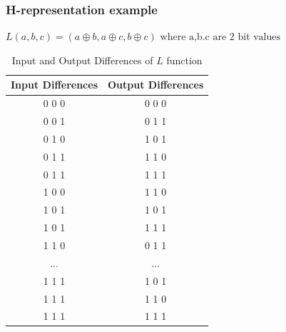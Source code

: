 \documentclass{beamer}
\begin{document}
\begin{frame}
    \frametitle{H-representation example}

    \begin{center}
    $L(a,b,c)=(a \oplus b , a \oplus c , b \oplus c ) \text{ where a,b.c are 2 bit values}  $
\end{center}
\begin{table}[h]
\footnotesize
\centering
\begin{tabular}{|c|c|}
\hline
\textbf{Input Differences} & \textbf{Output Differences} \\ \hline
0 0 0 & 0 0 0 \\ \hline
0 0 1 & 0 1 1 \\ \hline
0 1 0 & 1 0 1 \\ \hline
0 1 1 & 1 1 0 \\ \hline
0 1 1 & 1 1 1 \\ \hline
1 0 0 & 1 1 0 \\ \hline
1 0 1 & 1 0 1 \\ \hline
1 0 1 & 1 1 1 \\ \hline
1 1 0 & 0 1 1 \\ \hline
... & ... \\ \hline
1 1 1 & 1 0 1 \\ \hline
1 1 1 & 1 1 0 \\ \hline
1 1 1 & 1 1 1 \\ \hline
\end{tabular}
\caption{Input and Output Differences of $L$ function}
\label{tab:hreptab}
\end{table}
    
\end{frame}
\end{document}
